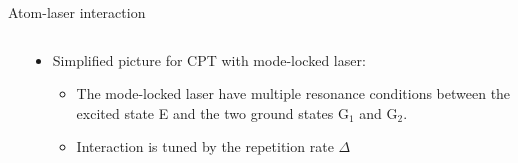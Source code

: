 \begin{block}{Atom-laser interaction}
\begin{columns}
\begin{column}{0.49\textwidth}
\begin{itemize}
      \end{itemize}
    \end{column}
    \begin{column}{0.49\textwidth}
      \begin{itemize}
      \item Simplified picture for CPT with mode-locked laser:
      \begin{figure}
        \begin{center}
          \setlength\fboxsep{0pt}
          \setlength\fboxrule{0.5pt}
        \end{center}
      \end{figure}
      \begin{itemize}
       \item The mode-locked laser have multiple resonance conditions between the excited state E and the two ground states G$_1$ and G$_2$.
      \item Interaction is tuned by the repetition rate $\Delta$
      \end{itemize}
      \end{itemize}
    \end{column}
  \end{columns}
\end{block}
